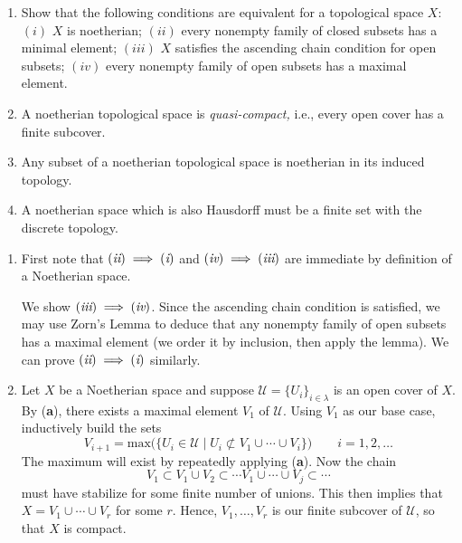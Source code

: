 \documentclass{hw_pset} %
\begin{document}
\begin{exercise}[1.7]
    \begin{enumerate}
        \item Show that the following conditions are equivalent for a topological
        space $X$: $(i)$ $X$ is noetherian; $(ii)$ every nonempty family of
        closed subsets has a minimal element; $(iii)$ $X$ satisfies the ascending
        chain condition for open subsets; $(iv)$ every nonempty family of open
        subsets has a maximal element.
      \item A noetherian topological space is \emph{quasi-compact,} i.e., every
        open cover has a finite subcover.
      \item Any subset of a noetherian topological space is noetherian in its
        induced topology.
      \item A noetherian space which is also Hausdorff must be a finite set with
        the discrete topology.    
    \end{enumerate}
\end{exercise}

\begin{solution}
    \begin{enumerate}
        \item First note that $(\emph{ii}) \implies (\emph{i})$ and $(\emph{iv}) \implies (\emph{iii})$ 
        are immediate by definition of a Noetherian space.
        
        We show $(\emph{iii}) \implies (\emph{iv})$. Since the ascending chain condition is satisfied, 
        we may use Zorn's Lemma to deduce that any nonempty family of open subsets has 
        a maximal element (we order it by inclusion, then apply the lemma).
        We can prove $(\emph{ii}) \implies (\emph{i})$ similarly.
    
        \item Let $X$ be a Noetherian space and suppose $\mathcal{U} = \{U_{i}\}_{i \in \lambda}$ 
        is an open cover of $X$. 
        By (\textbf{a}), there exists a maximal element $V_1$ of $\mathcal{U}$. Using 
        $V_1$ as our base case, inductively build the sets 
        \[
            V_{i+1} = \text{max}\bigg(\bigg\{ U_i \in \mathcal{U} \;\bigg|\; U_i \not\subset V_1 \cup \cdots \cup V_{i}  \bigg\}\bigg) \qquad i = 1, 2, \dots
        \]
        The maximum will exist by repeatedly applying (\textbf{a}). Now the chain 
        \[
            V_1 \subset V_1 \cup V_2 \subset \cdots V_1 \cup \cdots \cup V_j \subset \cdots
        \]
        must have stabilize for some finite number of unions. This then implies that 
        $X = V_1 \cup \cdots \cup V_r$ for some $r$. Hence, $V_1, \dots, V_r$ is our finite 
        subcover of $\mathcal{U}$, so that $X$ is compact.

    \end{enumerate}
\end{solution}
\end{document}
